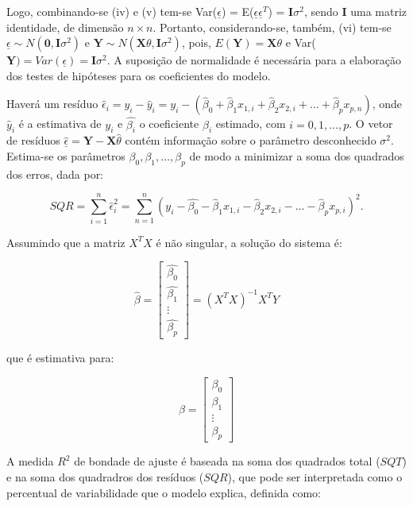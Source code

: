 \documentclass[
	12pt,				%
	a4paper,		%
	oneside,    %
	chapter=TITLE,		   %
	section=TITLE,		   %
	subsection=TITLE,	   %
	subsubsection=TITLE, %
	english,			%
	french,				%
	spanish,			%
	brazil,				%
]{abntex2}
\begin{document}
Logo, combinando-se (iv) e (v) tem-se Var(\(\underline{ \epsilon}\)) =
E(\(\underline{ \epsilon} \underline{ \epsilon}^T\)) =
\(\textbf{I}\sigma^2\), sendo \(\textbf{I}\) uma matriz identidade, de
dimensão \(n \times n\). Portanto, considerando-se, também, (vi) tem-se
\(\underline{ \epsilon} \sim N(\textbf{0},\textbf{I}\sigma^2)\) e
\(\textbf{Y} \sim N(\textbf{X}\theta, \textbf{I}\sigma^2)\), pois,
\(E(\textbf{Y}) = \textbf{X}\theta\) e
Var(\(\textbf{Y}) = Var(\underline{ \epsilon}) = \textbf{I}\sigma^2\). A
suposição de normalidade é necessária para a elaboração dos testes de
hipóteses para os coeficientes do modelo.

Haverá um resíduo
\(\hat{\epsilon}_i = y_i - \hat{y}_i = y_i - (\hat{\beta}_0 + \hat{\beta}_1x_{1,i} + \hat{\beta}_2x_{2,i} + \dots + \hat{\beta}_px_{p,n})\),
onde \(\hat{y}_i\) é a estimativa de \(y_i\) e \(\hat{\beta_i}\) o
coeficiente \(\beta_i\) estimado, com \(i = 0,1,\dots , p\). O vetor de
resíduos
\(\underline{\hat{\epsilon}} = \textbf{Y} - \textbf{X}\hat{\theta}\)
contém informação sobre o parâmetro desconhecido \(\sigma^2\). Estima-se
os parâmetros \(\beta_0,\beta_1,\dots,\beta_p\) de modo a minimizar a
soma dos quadrados dos erros, dada por:

\[SQR = \sum_{i=1}^n \hat{\epsilon}^2_i = \sum_{n=1}^n (y_i- \hat{\beta_0} - \hat{\beta}_1x_{1,i} - \hat{\beta}_2x_{2,i}- \dots - \hat{\beta}_px_{p,i})^2.\]

Assumindo que a matriz \(X^TX\) é não singular, a solução do sistema é:

\[
\hat{\beta}
=
\begin{bmatrix}
\hat{\beta_0} \\
\hat{\beta_1} \\
\vdots \\
\hat{\beta_p}
\end{bmatrix}
=
(X^TX)^{-1}X^TY
\]

que é estimativa para:

\[
\beta =
\begin{bmatrix}
\beta_0 \\
\beta_1 \\
\vdots \\
\beta_p
\end{bmatrix}
\]

A medida \(R^2\) de bondade de ajuste é baseada na soma dos quadrados
total (\(SQT\)) e na soma dos quadradros dos resíduos (\(SQR\)), que
pode ser interpretada como o percentual de variabilidade que o modelo
explica, definida como:
\end{document}
